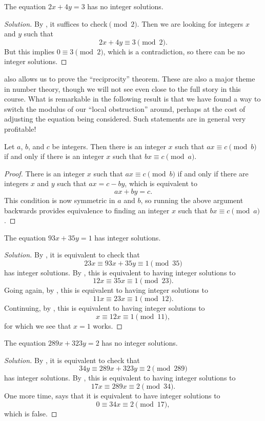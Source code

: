 \documentclass[../notes.tex]{subfiles}
\begin{document}
\begin{example}
	The equation $2x+4y=3$ has no integer solutions.
\end{example}
\begin{proof}[Solution]
	By , it suffices to check$\pmod2$. Then we are looking for integers $x$ and $y$ such that
	\[2x+4y\equiv3\pmod2.\]
	But this implies $0\equiv3\pmod2$, which is a contradiction, so there can be no integer solutions.
\end{proof}
 also allows us to prove the ``reciprocity'' theorem. These are also a major theme in number theory, though we will not see even close to the full story in this course. What is remarkable in the following result is that we have found a way to switch the modulus of our ``local obstruction'' around, perhaps at the cost of adjusting the equation being considered. Such statements are in general very profitable!
\begin{proposition} \label{prop:linear-recip}
	Let $a$, $b$, and $c$ be integers. Then there is an integer $x$ such that $ax\equiv c\pmod b$ if and only if there is an integer $x$ such that $bx\equiv c\pmod a$.
\end{proposition}
\begin{proof}
	There is an integer $x$ such that $ax\equiv c\pmod b$ if and only if there are integers $x$ and $y$ such that $ax=c-by$, which is equivalent to
	\[ax+by=c.\]
	This condition is now symmetric in $a$ and $b$, so running the above argument backwards provides equivalence to finding an integer $x$ such that $bx\equiv c\pmod a$.
\end{proof}
\begin{example}
	The equation $93x+35y=1$ has integer solutions.
\end{example}
\begin{proof}[Solution]
	By , it is equivalent to check that
	\[23x\equiv93x+35y\equiv1\pmod{35}\]
	has integer solutions. By , this is equivalent to having integer solutions to
	\[12x\equiv35x\equiv1\pmod{23}.\]
	Going again, by , this is equivalent to having integer solutions to
	\[11x\equiv23x\equiv1\pmod{12}.\]
	Continuing, by , this is equivalent to having integer solutions to
	\[x\equiv12x\equiv1\pmod{11},\]
	for which we see that $x=1$ works.
\end{proof}
\begin{example}
	The equation $289x+323y=2$ has no integer solutions.
\end{example}
\begin{proof}[Solution]
	By , it is equivalent to check that
	\[34y\equiv289x+323y\equiv2\pmod{289}\]
	has integer solutions. By , this is equivalent to having integer solutions to
	\[17x\equiv289x\equiv2\pmod{34}.\]
	One more time,  says that it is equivalent to have integer solutions to
	\[0\equiv34x\equiv2\pmod{17},\]
	which is false.
\end{proof}
\end{document}
